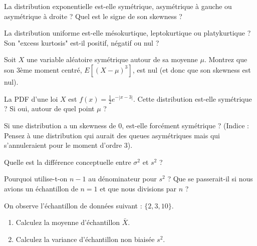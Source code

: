 \begin{exercicebox}
La distribution exponentielle est-elle symétrique, asymétrique à gauche ou asymétrique à droite ? Quel est le signe de son skewness ?
\end{exercicebox}

\begin{exercicebox}
La distribution uniforme est-elle mésokurtique, leptokurtique ou platykurtique ? Son "excess kurtosis" est-il positif, négatif ou nul ?
\end{exercicebox}


\begin{exercicebox}
Soit $X$ une variable aléatoire symétrique autour de sa moyenne $\mu$.
Montrez que son 3ème moment centré, $E[(X-\mu)^3]$, est nul (et donc que son skewness est nul).
\end{exercicebox}

\begin{exercicebox}
La PDF d'une loi $X$ est $f(x) = \frac{1}{2}e^{-|x-3|}$.
Cette distribution est-elle symétrique ? Si oui, autour de quel point $\mu$ ?
\end{exercicebox}

\begin{exercicebox}
Si une distribution a un skewness de 0, est-elle forcément symétrique ? (Indice : Pensez à une distribution qui aurait des queues asymétriques mais qui s'annuleraient pour le moment d'ordre 3).
\end{exercicebox}


\begin{exercicebox}
Quelle est la différence conceptuelle entre $\sigma^2$ et $s^2$ ?
\end{exercicebox}

\begin{exercicebox}
Pourquoi utilise-t-on $n-1$ au dénominateur pour $s^2$ ? Que se passerait-il si nous avions un échantillon de $n=1$ et que nous divisions par $n$ ?
\end{exercicebox}

\begin{exercicebox}
On observe l'échantillon de données suivant : $\{ 2, 3, 10 \}$.
\begin{enumerate}
    \item Calculez la moyenne d'échantillon $\bar{X}$.
    \item Calculez la variance d'échantillon non biaisée $s^2$.
\end{enumerate}
\end{exercicebox}

